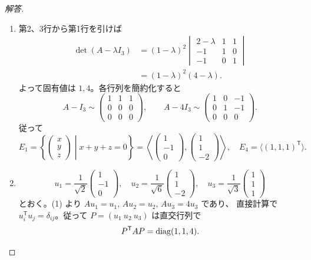 \begin{proof}[解答]
\begin{enumerate}
  \item[(1)]
  第2、3行から第1行を引けば
  \begin{align*}
  \det(A-\lambda I_3)
  &=(1-\lambda)^2
  \begin{vmatrix}
  2-\lambda&1&1\\
  -1&1&0\\
  -1&0&1
  \end{vmatrix}\\
  &=(1-\lambda)^2(4-\lambda).
  \end{align*}
  よって固有値は $1,4$。各行列を簡約化すると
  \[
  A-I_3\sim
  \begin{pmatrix}1&1&1\\0&0&0\\0&0&0\end{pmatrix},
  \qquad
  A-4I_3\sim
  \begin{pmatrix}1&0&-1\\0&1&-1\\0&0&0\end{pmatrix}.
  \]
  従って
  \[
  E_1=\left\{\begin{pmatrix}x\\y\\z\end{pmatrix}\middle|x+y+z=0\right\}
  =\left\langle
  \begin{pmatrix}1\\-1\\0\end{pmatrix},
  \begin{pmatrix}1\\1\\-2\end{pmatrix}
  \right\rangle,
  \quad
  E_4=\langle(1,1,1)^{\mathsf T}\rangle.
  \]

  \item[(2)]
  \[
  u_1=\frac1{\sqrt2}\begin{pmatrix}1\\-1\\0\end{pmatrix},\quad
  u_2=\frac1{\sqrt6}\begin{pmatrix}1\\1\\-2\end{pmatrix},\quad
  u_3=\frac1{\sqrt3}\begin{pmatrix}1\\1\\1\end{pmatrix}
  \]
  とおく。(1) より $Au_1=u_1$, $Au_2=u_2$, $Au_3=4u_3$ であり、
  直接計算で $u_i^{\mathsf T}u_j=\delta_{ij}$。従って
  $P=(u_1\ u_2\ u_3)$ は直交行列で
  \[
  P^{\mathsf T}AP=\operatorname{diag}(1,1,4).
  \]


\end{enumerate}
\end{proof}
